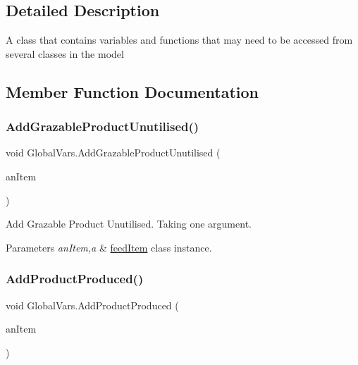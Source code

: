 \subsection{Detailed Description}
A class that contains variables and functions that may need to be accessed from several classes in the model 

\subsection{Member Function Documentation}
\mbox{\label{class_global_vars_ab89dab6808de1b3cf7dea479146f6865}} 
\subsubsection{\texorpdfstring{AddGrazableProductUnutilised()}{AddGrazableProductUnutilised()}}
{\footnotesize\ttfamily void Global\+Vars.\+Add\+Grazable\+Product\+Unutilised (\begin{DoxyParamCaption}\item[{\mbox{\hyperlink{classfeed_item}{feed\+Item}}}]{an\+Item }\end{DoxyParamCaption})\hspace{0.3cm}{\ttfamily [inline]}}



Add Grazable Product Unutilised. Taking one argument. 


\begin{DoxyParams}{Parameters}
{\em an\+Item,a} & \mbox{\hyperlink{classfeed_item}{feed\+Item}} class instance. \\
\hline
\end{DoxyParams}
\mbox{\label{class_global_vars_ab82efa871de33736324f919209f89c46}} 
\subsubsection{\texorpdfstring{AddProductProduced()}{AddProductProduced()}}
{\footnotesize\ttfamily void Global\+Vars.\+Add\+Product\+Produced (\begin{DoxyParamCaption}\item[{\mbox{\hyperlink{classfeed_item}{feed\+Item}}}]{an\+Item }\end{DoxyParamCaption})\hspace{0.3cm}{\ttfamily [inline]}}



